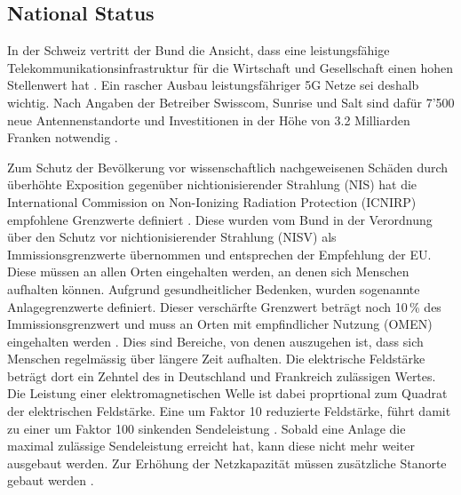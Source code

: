 \subsection{National Status}
\begin{German}
    In der Schweiz vertritt der Bund die Ansicht, dass eine leistungsfähige Telekommunikationsinfrastruktur für die Wirtschaft und Gesellschaft einen hohen Stellenwert hat \cite{bundesratNachhaltigesMobilfunknetzBericht2022}. Ein rascher Ausbau leistungsfähriger 5G Netze sei deshalb wichtig. Nach Angaben der Betreiber Swisscom, Sunrise und Salt sind dafür 7'500 neue Antennenstandorte und Investitionen in der Höhe von 3.2 Milliarden Franken notwendig \cite{bundesratNachhaltigesMobilfunknetzBericht2022}.

    Zum Schutz der Bevölkerung vor wissenschaftlich nachgeweisenen Schäden durch überhöhte Exposition gegenüber nichtionisierender Strahlung (NIS) hat die International Commission on Non-Ionizing Radiation Protection (ICNIRP) empfohlene Grenzwerte definiert \cite{baumannMitVerordnungUeber2005}. Diese wurden vom Bund in der Verordnung über den Schutz vor nichtionisierender Strahlung (NISV) als Immissionsgrenzwerte übernommen und entsprechen der Empfehlung der EU. Diese müssen an allen Orten eingehalten werden, an denen sich Menschen aufhalten können. Aufgrund gesundheitlicher Bedenken, wurden sogenannte Anlagegrenzwerte definiert. Dieser verschärfte Grenzwert beträgt noch 10\,\% des Immissionsgrenzwert und muss an Orten mit empfindlicher Nutzung (OMEN) eingehalten werden \cite{baumannMitVerordnungUeber2005}. Dies sind Bereiche, von denen auszugehen ist, dass sich Menschen regelmässig über längere Zeit aufhalten. Die elektrische Feldstärke beträgt dort ein Zehntel des in Deutschland und Frankreich zulässigen Wertes. Die Leistung einer elektromagnetischen Welle ist dabei proprtional zum Quadrat der elektrischen Feldstärke. Eine um Faktor 10 reduzierte Feldstärke, führt damit zu einer um Faktor 100 sinkenden Sendeleistung \cite{chance5gAnlagegrenzwerteImMobilfunk}.
    Sobald eine Anlage die maximal zulässige Sendeleistung erreicht hat, kann diese nicht mehr weiter ausgebaut werden. Zur Erhöhung der Netzkapazität müssen zusätzliche Stanorte gebaut werden \cite{bundesratNachhaltigesMobilfunknetzBericht2022}.
\end{German}

